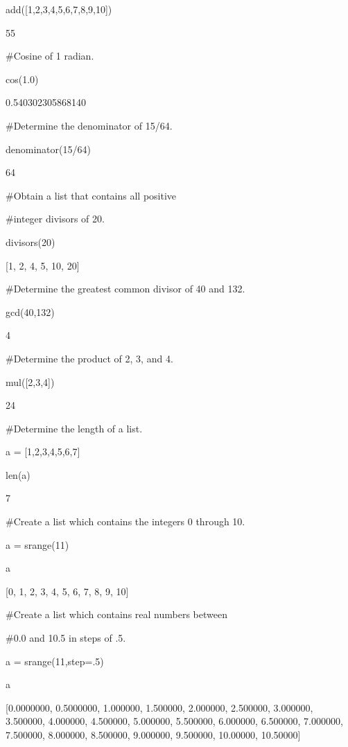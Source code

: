 \documentclass[12pt,oneside]{book}
\begin{document}
add([1,2,3,4,5,6,7,8,9,10])

{\textbar}

55


\#Cosine of 1 radian.

cos(1.0)

{\textbar}

0.540302305868140

\#Determine the denominator of 15/64.

denominator(15/64)

{\textbar}

64


\#Obtain a list that contains all positive 

\#integer divisors of 20.

divisors(20)

{\textbar}

[1, 2, 4, 5, 10, 20]


\#Determine the greatest common divisor of 40 and 132.

gcd(40,132)

{\textbar}

4


\#Determine the product of 2, 3, and 4.

mul([2,3,4])

{\textbar}

24


\#Determine the length of a list.

a = [1,2,3,4,5,6,7]

len(a)

{\textbar}

7


\#Create a list which contains the integers 0 through 10.

a = srange(11)

a

{\textbar}

[0, 1, 2, 3, 4, 5, 6, 7, 8, 9, 10]

\#Create a list which contains real numbers between

\#0.0 and 10.5 in steps of .5.

a = srange(11,step=.5)

a

{\textbar}

[0.0000000, 0.5000000, 1.000000, 1.500000, 2.000000, 2.500000, 3.000000,
3.500000, 4.000000, 4.500000, 5.000000, 5.500000, 6.000000, 6.500000,
7.000000, 7.500000, 8.000000, 8.500000, 9.000000, 9.500000, 10.00000,
10.50000]
\end{document}
